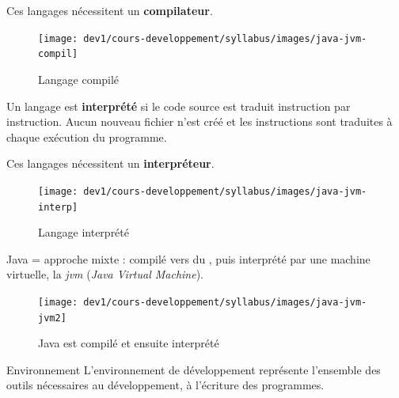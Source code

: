 \begin{hideedit}
\begin{frame}
  Ces langages nécessitent un \textbf{compilateur}.

  \begin{figure}[h]
  \begin{center}
  \texttt{[image: dev1/cours-developpement/syllabus/images/java-jvm-compil]}
  \caption{Langage compilé}
  \label{compilé}
  \end{center}
  \end{figure}
\end{frame}

\begin{frame}
  \begin{definition}
    Un langage est \textbf{interprété} si le code source est traduit
    instruction par instruction. Aucun nouveau fichier n'est créé et les
    instructions sont traduites à chaque exécution du programme.
  \end{definition}

  Ces langages nécessitent un \textbf{interpréteur}.

  \begin{figure}[h]
  \begin{center}
  \texttt{[image: dev1/cours-developpement/syllabus/images/java-jvm-interp]}
  \caption{Langage interprété}
  \label{interprété}
  \end{center}
  \end{figure}
\end{frame}

\begin{frame}
  Java = approche mixte : compilé vers du , puis
  interprété par une machine virtuelle, la
  \textit{jvm}  (\textit{Java Virtual Machine}).

  \bigskip
  \begin{figure}[h]
  \begin{center}
  \texttt{[image: dev1/cours-developpement/syllabus/images/java-jvm-jvm2]}

  \caption{Java est compilé et ensuite interprété}
  \label{jvm}
  \end{center}
  \end{figure}
\end{frame}

\begin{frame}{Environnement}
  L'environnement de développement représente l'ensemble des outils
  nécessaires au développement, à l'écriture des programmes.


\end{frame}
\end{hideedit}
